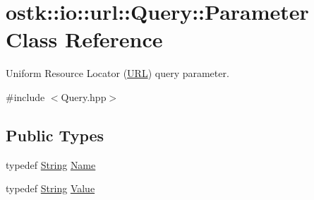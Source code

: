 \hypertarget{classostk_1_1io_1_1url_1_1_query_1_1_parameter}{}\section{ostk\+:\+:io\+:\+:url\+:\+:Query\+:\+:Parameter Class Reference}
\label{classostk_1_1io_1_1url_1_1_query_1_1_parameter}


Uniform Resource Locator (\hyperlink{classostk_1_1io_1_1_u_r_l}{U\+RL}) query parameter.  




{\ttfamily \#include $<$Query.\+hpp$>$}

\subsection*{Public Types}
\begin{DoxyCompactItemize}
\item 
typedef \hyperlink{namespaceostk_1_1io_a95d49b120613a7610cb1b4f03b1116b6}{String} \hyperlink{classostk_1_1io_1_1url_1_1_query_1_1_parameter_ad176899a3555e0d0efeb0c13f73a8a80}{Name}
\item 
typedef \hyperlink{namespaceostk_1_1io_a95d49b120613a7610cb1b4f03b1116b6}{String} \hyperlink{classostk_1_1io_1_1url_1_1_query_1_1_parameter_ada177e3a9d839a7900aae8a718207bbd}{Value}
\end{DoxyCompactItemize}
